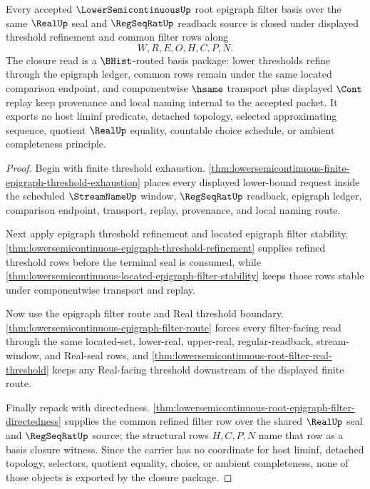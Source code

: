 \begin{theorem}
\label{thm:lowersemicontinuous-root-epigraph-filter-basis-closure}
Every accepted $\LowerSemicontinuousUp$ root epigraph filter basis over the same $\RealUp$ seal and $\RegSeqRatUp$ readback source is closed under displayed threshold refinement and common filter rows along
$$
W,R,E,O,H,C,P,N .
$$
The closure read is a $\BHist$-routed basis package: lower thresholds refine through the epigraph ledger, common rows remain under the same located comparison endpoint, and componentwise $\hsame$ transport plus displayed $\Cont$ replay keep provenance and local naming internal to the accepted packet. It exports no host liminf predicate, detached topology, selected approximating sequence, quotient $\RealUp$ equality, countable choice schedule, or ambient completeness principle.
\end{theorem}
\begin{proof}
Begin with finite threshold exhaustion. \autoref{thm:lowersemicontinuous-finite-epigraph-threshold-exhaustion} places every displayed lower-bound request inside the scheduled $\StreamNameUp$ window, $\RegSeqRatUp$ readback, epigraph ledger, comparison endpoint, transport, replay, provenance, and local naming route.

Next apply epigraph threshold refinement and located epigraph filter stability. \autoref{thm:lowersemicontinuous-epigraph-threshold-refinement} supplies refined threshold rows before the terminal seal is consumed, while \autoref{thm:lowersemicontinuous-located-epigraph-filter-stability} keeps those rows stable under componentwise transport and replay.

Now use the epigraph filter route and Real threshold boundary. \autoref{thm:lowersemicontinuous-epigraph-filter-route} forces every filter-facing read through the same located-set, lower-real, upper-real, regular-readback, stream-window, and Real-seal rows, and \autoref{thm:lowersemicontinuous-root-filter-real-threshold} keeps any Real-facing threshold downstream of the displayed finite route.

Finally repack with directedness. \autoref{thm:lowersemicontinuous-root-epigraph-filter-directedness} supplies the common refined filter row over the shared $\RealUp$ seal and $\RegSeqRatUp$ source; the structural rows $H,C,P,N$ name that row as a basis closure witness. Since the carrier has no coordinate for host liminf, detached topology, selectors, quotient equality, choice, or ambient completeness, none of those objects is exported by the closure package.
\end{proof}

